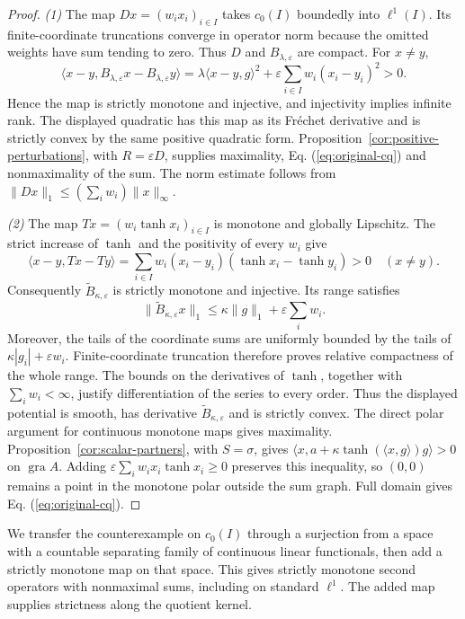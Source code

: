 \documentclass[11pt]{article}
\newcommand{\gra}{\operatorname{gra}}
\newcommand{\pair}[2]{\langle #1,#2\rangle}
\theoremstyle{definition}
\theoremstyle{remark}
\begin{document}
\begin{proof}
\noindent\textit{(1)} The map $Dx=(w_ix_i)_{i\in I}$ takes $c_0(I)$ boundedly into $\ell^1(I)$. Its finite-coordinate truncations converge in operator norm because the omitted weights have sum tending to zero. Thus $D$ and $B_{\lambda,\varepsilon}$ are compact. For $x\ne y$,
\[
\pair{x-y}{B_{\lambda,\varepsilon}x-B_{\lambda,\varepsilon}y}
=\lambda\pair{x-y}{g}^2+\varepsilon\sum_{i\in I}w_i(x_i-y_i)^2>0.
\]
Hence the map is strictly monotone and injective, and injectivity implies infinite rank. The displayed quadratic has this map as its Fr\'{e}chet derivative and is strictly convex by the same positive quadratic form. Proposition~\ref{cor:positive-perturbations}, with $R=\varepsilon D$, supplies maximality, Eq. (\ref{eq:original-cq}) and nonmaximality of the sum. The norm estimate follows from $\|Dx\|_1\le(\sum_iw_i)\|x\|_\infty$.

\noindent\textit{(2)} The map $Tx=(w_i\tanh x_i)_{i\in I}$ is monotone and globally Lipschitz. The strict increase of $\tanh$ and the positivity of every $w_i$ give
\[
\pair{x-y}{Tx-Ty}
=\sum_{i\in I}w_i(x_i-y_i)(\tanh x_i-\tanh y_i)>0
\quad(x\ne y).
\]
Consequently $\widetilde B_{\kappa,\varepsilon}$ is strictly monotone and injective. Its range satisfies
\[
\|\widetilde B_{\kappa,\varepsilon}x\|_1
\le\kappa\|g\|_1+\varepsilon\sum_iw_i.
\]
Moreover, the tails of the coordinate sums are uniformly bounded by the tails of $\kappa|g_i|+\varepsilon w_i$. Finite-coordinate truncation therefore proves relative compactness of the whole range. The bounds on the derivatives of $\tanh$, together with $\sum_iw_i<\infty$, justify differentiation of the series to every order. Thus the displayed potential is smooth, has derivative $\widetilde B_{\kappa,\varepsilon}$ and is strictly convex. The direct polar argument for continuous monotone maps gives maximality. Proposition~\ref{cor:scalar-partners}, with $S=\sigma$, gives $\pair{x}{a+\kappa\tanh(\pair{x}{g})g}>0$ on $\gra A$. Adding $\varepsilon\sum_iw_ix_i\tanh x_i\ge0$ preserves this inequality, so $(0,0)$ remains a point in the monotone polar outside the sum graph. Full domain gives Eq. (\ref{eq:original-cq}).
\end{proof}

We transfer the counterexample on $c_0(I)$ through a surjection from a space with a countable separating family of continuous linear functionals, then add a strictly monotone map on that space. This gives strictly monotone second operators with nonmaximal sums, including on standard $\ell^1$. The added map supplies strictness along the quotient kernel.
\end{document}
